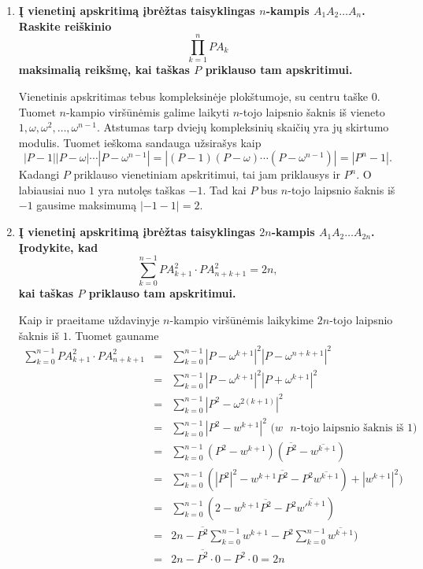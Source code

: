 \begin{enumerate}
\medskip

\item {\bf Į vienetinį apskritimą įbrėžtas taisyklingas $n$-kampis $A_1A_2\dots A_{n}$. Raskite reiškinio 
$$\prod_{k=1}^{n} PA_k$$ maksimalią reikšmę, kai taškas $P$ priklauso tam apskritimui.}

\medskip

Vienetinis apskritimas tebus kompleksinėje plokštumoje, su centru taške $0$. Tuomet $n$-kampio viršūnėmis galime laikyti $n$-tojo laipsnio šaknis iš vieneto $1, \omega, \omega^2, \dots, \omega^{n-1}$. Atstumas tarp dviejų kompleksinių skaičių yra jų skirtumo modulis. Tuomet ieškoma sandauga užsirašys kaip $$|P-1||P-\omega|\cdots|P-\omega^{n-1}| = |(P-1)(P-\omega)\cdots(P-\omega^{n-1})| = |P^n -1|.$$
Kadangi $P$ priklauso vienetiniam apskritimui, tai jam priklausys ir $P^n$. O labiausiai nuo $1$ yra nutolęs taškas $-1$. Tad kai $P$ bus $n$-tojo laipsnio šaknis iš $-1$ gausime maksimumą $|-1-1|=2.$

\medskip

\item {\bf Į vienetinį apskritimą įbrėžtas taisyklingas $2n$-kampis $A_1A_2\dots A_{2n}$. Įrodykite, kad 
$$\sum_{k=0}^{n-1}PA_{k+1}^2\cdot PA_{n+k+1}^2 = 2n,$$ kai taškas $P$ priklauso tam apskritimui.}

\medskip

Kaip ir praeitame uždavinyje $n$-kampio viršūnėmis laikykime $2n$-tojo laipsnio šaknis iš $1$. Tuomet gauname
\begin{eqnarray*}
\sum_{k=0}^{n-1}PA_{k+1}^2\cdot PA_{n+k+1}^2 &=& \sum_{k=0}^{n-1}|P-\omega^{k+1}|^2|P-\omega^{n+k+1}|^2
\\ &=&\sum_{k=0}^{n-1}|P-\omega^{k+1}|^2|P+\omega^{k+1}|^2 
\\ &=&\sum_{k=0}^{n-1}|P^2-\omega^{2(k+1)}|^2
\\ &=&\sum_{k=0}^{n-1}|P^2-w^{k+1}|^2 \text{ \ ($w$ $n$-tojo laipsnio šaknis iš $1$)}
\\ &=&\sum_{k=0}^{n-1}(P^2-w^{k+1})(\overline{P^2}-\overline{w^{k+1}})
\\ &=&\sum_{k=0}^{n-1}( |P^2|^2 - w^{k+1}\overline{P^2} - P^2\overline{w^{k+1}}) + |w^{k+1}|^2)
\\ &=&\sum_{k=0}^{n-1}( 2 - w^{k+1}\overline{P^2} - P^2\overline{w'^{k+1}})
\\ &=& 2n - \overline{P^2}\sum_{k=0}^{n-1}w^{k+1} - P^2\sum_{k=0}^{n-1}\overline{w^{k+1}})
\\ &=& 2n -\overline{P^2} \cdot 0 - P^2 \cdot 0 = 2n
\end{eqnarray*}


\end{enumerate}
